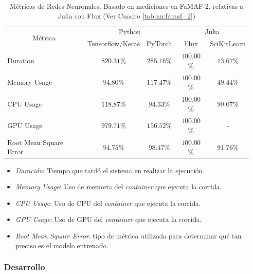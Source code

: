 \documentclass[11pt]{article}
\let\Oldsubsubsection\subsubsection
\renewcommand{\subsubsection}{\FloatBarrier\Oldsubsubsection}
\newcommand{\english}[1]{\textit{#1}}
\newcommand{\technical}[1]{\textit{#1}}
\begin{document}
\begin{table}[H]
\centering
\begin{tabular}{|l|cc|cc|}
\hline
\multicolumn{1}{|c|}{\multirow{2}{*}{Métrica}} & \multicolumn{2}{c|}{Python} & \multicolumn{2}{c|}{Julia} \\ \cline{2-5} 
\multicolumn{1}{|c|}{} & \multicolumn{1}{c|}{Tensorflow/Keras} & PyTorch & \multicolumn{1}{c|}{Flux} & SciKitLearn \\ \hline
Duration & \multicolumn{1}{c|}{$820.31$\%} & $285.16\%$& \multicolumn{1}{c|}{$100.00$\%} & \multicolumn{1}{c|}{$13.67$\%} \\ \hline
Memory Usage & \multicolumn{1}{c|}{$94.80$\%} & $117.47\%$& \multicolumn{1}{c|}{$100.00$\%} & \multicolumn{1}{c|}{$49.44$\%} \\ \hline
CPU Usage & \multicolumn{1}{c|}{$118.87$\%} & $94.33\%$& \multicolumn{1}{c|}{$100.00$\%} & \multicolumn{1}{c|}{$99.07$\%} \\ \hline
GPU Usage & \multicolumn{1}{c|}{$979.71$\%} & $156.52\%$& \multicolumn{1}{c|}{$100.00$\%} & - \\ \hline
Root Mean Square Error & \multicolumn{1}{c|}{$94.75$\%} & $98.47\%$& \multicolumn{1}{c|}{$100.00$\%} & \multicolumn{1}{c|}{$91.76$\%} \\ \hline
\end{tabular}
\caption{Métricas de Redes Neuronales. Basado en mediciones en FaMAF-2, relativas a Julia con Flux (Ver Cuadro \ref{tab:nn:famaf_2})}
\end{table}

\begin{itemize}
    \item \technical{Duración}: Tiempo que tardó el sistema en realizar la ejecución.
    \item \technical{Memory Usage}: Uso de memoria del \english{container} que ejecuta la corrida.
    \item \technical{CPU Usage}: Uso de CPU del \english{container} que ejecuta la corrida.
    \item \technical{GPU Usage}: Uso de GPU del \english{container} que ejecuta la corrida.
    \item \technical{Root Mean Square Error}: tipo de métrica utilizada para determinar qué tan preciso es el modelo entrenado.
\end{itemize}

\subsubsection{Desarrollo}
\end{document}
